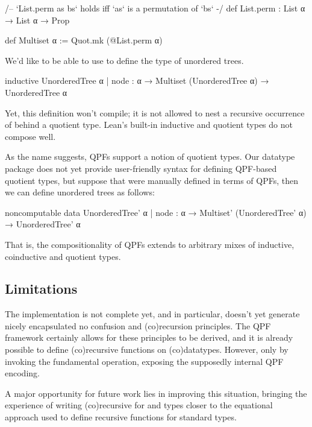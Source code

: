 \begin{leancode}
  /-- `List.perm as bs` holds iff `as` is a permutation of `bs` -/
  def List.perm : List α → List α → Prop

  def Multiset α := Quot.mk (@List.perm α)
\end{leancode}

We'd like to be able to use  to define the type of unordered trees. 

\begin{badleancode}

  inductive UnorderedTree α
    | node : α →  Multiset (UnorderedTree α) → UnorderedTree α
    
\end{badleancode}

Yet, this definition won't compile; it is not allowed to nest a recursive occurrence of 
behind a quotient type. Lean's built-in inductive and quotient types do not compose well.


As the name suggests, QPFs support a notion of quotient types. Our datatype package does not yet
provide user-friendly syntax for defining QPF-based quotient types, but suppose that  were manually
defined in terms of QPFs, then we can define unordered trees as follows:
\begin{leancode}
  noncomputable data UnorderedTree' α
    | node : α →  Multiset' (UnorderedTree' α) → UnorderedTree' α
\end{leancode}

That is, the compositionality of QPFs extends to arbitrary mixes of inductive, coinductive and quotient types.




\subsection*{Limitations}
The implementation is not complete yet, and in particular, doesn't yet generate nicely encapsulated no confusion and (co)recursion principles.
The QPF framework certainly allows for these principles to be derived, and it is already possible to define (co)recursive functions on (co)datatypes.
However, only by invoking the fundamental operation, exposing the supposedly internal QPF encoding. 

A major opportunity for future work lies in improving this situation, bringing the experience of writing (co)recursive for \data{} and \codata{} types closer to the equational approach used to define recursive functions for standard \inductive{} types.



